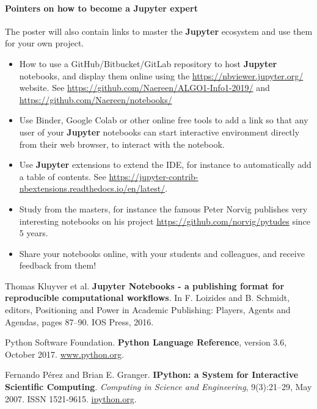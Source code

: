 \documentclass[runningheads]{llncs}
\newcommand{\Jupyter}{\textbf{Jupyter}}
\begin{document}



\paragraph{Pointers on how to become a \Jupyter{} expert}

The poster will also contain links to master the \Jupyter{} ecosystem and use them for your own project.

\begin{itemize}
    \item How to use a GitHub/Bitbucket/GitLab repository to host \Jupyter{} notebooks, and display them online using the \url{https://nbviewer.jupyter.org/} website.
    See \url{https://github.com/Naereen/ALGO1-Info1-2019/} and \url{https://github.com/Naereen/notebooks/}
    \item Use Binder, Google Colab or other online free tools to add a link so that any user of your \Jupyter{} notebooks can start interactive environment directly from their web browser, to interact with the notebook.
    \item Use \Jupyter{} extensions to extend the IDE, for instance to automatically add a table of contents. See \url{https://jupyter-contrib-nbextensions.readthedocs.io/en/latest/}.
    \item Study from the masters, for instance the famous Peter Norvig publishes very interesting notebooks on his project \url{https://github.com/norvig/pytudes} since 5 years.
    \item Share your notebooks online, with your students and colleagues, and receive feedback from them!
\end{itemize}



%
%
% 
% 
%
\begin{thebibliography}{8}
    Thomas Kluyver et al.
    \textbf{Jupyter Notebooks - a publishing format for reproducible computational workflows}.
    In F. Loizides and B. Schmidt, editors, Positioning and Power in Academic Publishing: Players, Agents and Agendas, pages 87–90. IOS Press, 2016.

    Python Software Foundation.
    \textbf{Python Language Reference}, version 3.6, October 2017. \url{www.python.org}.

    Fernando Pérez and Brian E. Granger.
    \textbf{IPython: a System for Interactive Scientific Computing}.
    \emph{Computing in Science and Engineering}, 9(3):21–29, May 2007. ISSN 1521-9615. \url{ipython.org}.
\end{thebibliography}
\end{document}

